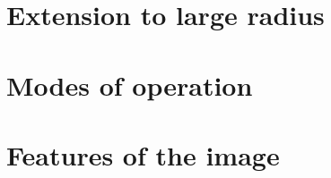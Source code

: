 \documentclass{emulateapjx}
\begin{document}
\section{Extension to large radius}

\section{Modes of operation}

\section{Features of the image}





\end{document}
